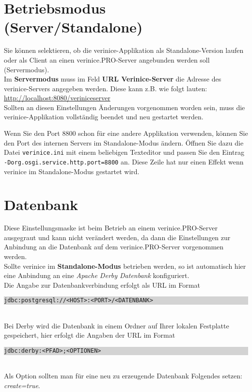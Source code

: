 \documentclass[a4paper,10pt]{book}
\begin{document}
\section{Betriebsmodus (Server/Standalone)}
\label{sec:betriebsmodus-server-standalone}

Sie können selektieren, ob die verinice-Applikation als Standalone-Version laufen oder als Client an einen verinice.\textsc{PRO}-Server
angebunden werden soll (Servermodus).
\newline\\
Im \textbf{Servermodus} muss im Feld \textbf{URL Verinice-Server} die Adresse des verinice-Servers angegeben werden. Diese kann
z.B. wie folgt lauten: \\ \href{http://localhost:8080/veriniceserver}{http://localhost:8080/veriniceserver}
\newline\\
Sollten an diesen Einstellungen Änderungen vorgenommen worden sein, muss die verinice-Applikation vollständig beendet und neu gestartet werden.

Wenn Sie den Port 8800 schon für eine andere Applikation verwenden,
können Sie den Port des internen Servers im Standalone-Modus
ändern. Öffnen Sie dazu die Datei \texttt{verinice.ini} mit einem
beliebigen Texteditor und passen Sie den Eintrag
\texttt{-Dorg.osgi.service.http.port=8800} an. Diese Zeile hat nur
einen Effekt wenn verinice im Standalone-Modus gestartet wird.

\section{Datenbank} \label{sec:datenbank}
Diese Einstellungsmaske ist beim Betrieb an einem verinice.\textsc{PRO}-Server ausgegraut und kann nicht verändert werden, da dann die Einstellungen zur
Anbindung an die Datenbank auf dem verinice.\textsc{PRO}-Server vorgenommen werden.
\newline\\
Sollte verinice im \textbf{Standalone-Modus} betrieben werden, so ist automatisch hier eine Anbindung an eine {\em Apache Derby Datenbank} konfiguriert.
\newline\\
Die Angabe zur Datenbankverbindung erfolgt als URL im Format
\newline\\
\colorbox{lightgray}{\parbox{\textwidth}{
{\tt jdbc:postgresql://<HOST>:<PORT>/<DATENBANK>}
}}
\newline\\
Bei Derby wird die Datenbank in einem Ordner auf Ihrer lokalen Festplatte gespeichert, hier erfolgt die Angaben der URL im Format
\newline\\
\colorbox{lightgray}{\parbox{\textwidth}{
{\tt jdbc:derby:<PFAD>;<OPTIONEN>}
}}
\newline\\
Als Option sollten man für eine neu zu erzeugende Datenbank Folgendes setzen: {\em create=true}.
\end{document}
